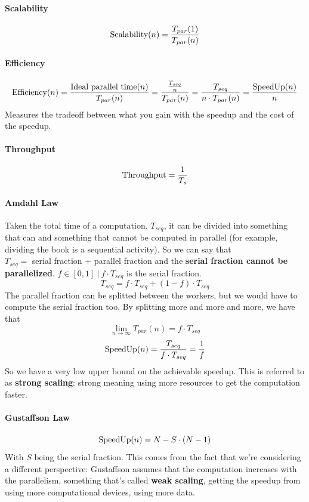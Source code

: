 \documentclass[10pt]{report}
\begin{document}
\paragraph{Scalability} $$\hbox{Scalability}(n)=\frac{T_{par}(1)}{T_{par}(n)}$$
\paragraph{Efficiency} $$\hbox{Efficiency}(n) = \frac{\hbox{Ideal parallel time}(n)}{T_{par}(n)} = \frac{\frac{T_{seq}}{n}}{T_{par}(n)} = \frac{T_{seq}}{n\cdot T_{par}(n)} = \frac{\hbox{SpeedUp}(n)}{n}$$
Measures the tradeoff between what you gain with the speedup and the cost of the speedup.
\paragraph{Throughput} $$\hbox{Throughput} = \frac{1}{T_s}$$
\paragraph{Amdahl Law} Taken the total time of a computation, $T_{seq}$, it can be divided into something that can and something that cannot be computed in parallel (for example, dividing the book is a sequential activity). So we can say that\\$T_{seq} =$ serial fraction + parallel fraction and the \textbf{serial fraction cannot be parallelized}. $f\in[0,1]\:|\:f\cdot T_{seq}$ is the serial fraction.
$$T_{seq} = f\cdot T_{seq} + (1-f)\cdot T_{seq}$$
The parallel fraction can be splitted between the workers, but we would have to compute the serial fraction too. By splitting more and more and more, we have that $$\lim_{n\to\infty} T_{par}(n) = f\cdot T_{seq}$$ $$\hbox{SpeedUp}(n) = \frac{T_{seq}}{f\cdot T_{seq}} = \frac{1}{f}$$
So we have a very low upper bound on the achievable speedup. This is referred to as \textbf{strong scaling}: strong meaning using more resources to get the computation faster.
\paragraph{Gustaffson Law} $$\hbox{SpeedUp}(n) = N - S\cdot(N-1)$$ With $S$ being the serial fraction. This comes from the fact that we're considering a different perspective: Gustaffson assumes that the computation increases with the parallelism, something that's called \textbf{weak scaling}, getting the speedup from using more computational devices, using more data. %
\end{document}
